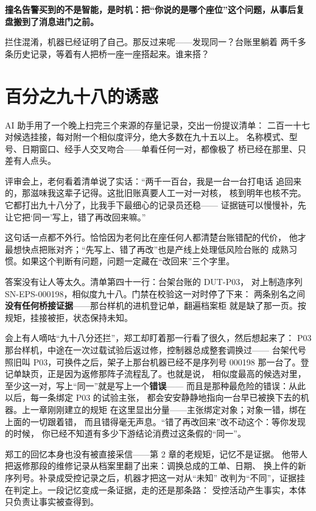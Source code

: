 \textbf{撞名告警买到的不是智能，是时机：把“你说的是哪个座位”这个问题，从事后复盘搬到了消息进门之前。}

拦住混淆，机器已经证明了自己。那反过来呢——发现同一？台账里躺着
两千多条历史记录，等着有人把桥一座一座搭起来。谁来搭？

\section{百分之九十八的诱惑}

AI 助手用了一个晚上扫完三个来源的存量记录，交出一份提议清单：
二百一十七对候选挂接，每对附一个相似度评分，绝大多数在九十五以上。
名称模式、型号、日期窗口、经手人交叉吻合——单看任何一对，都像极了
桥已经在那里、只差有人点头。

评审会上，老何看着清单说了实话：“两千一百台，我是一台一台打电话
追回来的，那滋味我这辈子记得。这批旧账真要人工一对一对核，
核到明年也核不完。它都打出九十八分了，比我手下最细心的记录员还稳——
证据链可以慢慢补，先让它把‘同一’写上，错了再改回来嘛。”

这句话一点都不外行。恰恰因为老何比在座任何人都清楚台账错配的代价，
他才最想快点把账对齐；“先写上、错了再改”也是产线上处理低风险台账的
成熟习惯。如果这个判断有问题，问题一定藏在“改回来”三个字里。

答案没有让人等太久。清单第四十一行：台架台账的 DUT-P03，
对上制造序列 SN-EPS-000198，相似度九十八。门禁在校验这一对时停了下来：
两条别名之间\textbf{没有任何桥接证据}——那台样机的进机登记单，翻遍档案柜
就是缺了那一页。按规矩，挂接被拒，状态保持未知。

会上有人嘀咕“九十八分还拦”，郑工却盯着那一行看了很久，然后想起来了：
P03 那台样机，中途在一次过载试验后返过修，控制器总成整套调换过——
台架代号照旧叫 P03，可换件之后，架子上那台机器已经不是序列号 000198
那一台了。登记单缺页，正是因为返修那阵子流程乱了。也就是说，
相似度最高的候选对里，至少这一对，写上“同一”就是写上一个\textbf{错误}——
而且是那种最危险的错误：从此以后，每一条绑定 P03 的试验主张，
都会安安静静地指向一台早已被换下去的机器。上一章刚刚建立的规矩
在这里显出分量——主张绑定对象；对象一错，绑在上面的一切跟着错，
而且错得毫无声息。“错了再改回来”改不动这个：等你发现的时候，
你已经不知道有多少下游结论消费过这条假的“同一”。

郑工的回忆本身也没有被直接采信——第 2 章的老规矩，记忆不是证据。
他带人把返修那段的维修记录从档案里翻了出来：调换总成的工单、日期、
换上件的新序列号。补录成受控记录之后，机器才把这一对从“未知”
改判为“不同”，证据挂在判定上。一段记忆变成一条证据，走的还是那条路：
受控活动产生事实，本体只负责让事实被查得到。


